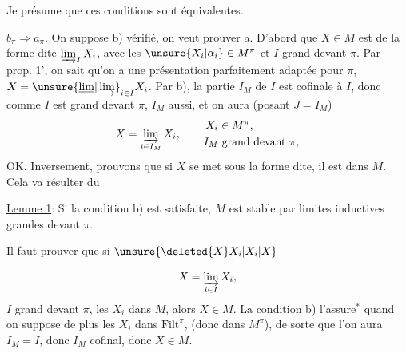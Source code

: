 Je présume que ces conditions sont équivalentes.

$b_\pi\Rightarrow a_\pi$. On suppose b) vérifié, on veut prouver a. D'abord que  $X\in M$ est de la forme dite $\varinjlim_I X_i$, avec les $\unsure{X_i|\alpha_i}\in M^{\pi}$ et $I$ grand devant $\pi$. Par prop. 1', on sait qu'on a une présentation parfaitement adaptée pour $\pi$, $X=\unsure{\underline{\lim}|\varinjlim}_{i\in I}X_i$. Par b),  la partie $I_M$ de $I$ est cofinale à $I$, donc comme $I$ est grand devant $\pi$, $I_M$ aussi, et on aura (posant $J=I_M$)
\[
X=\varinjlim_{i\in I_M}X_i,\qquad\begin{aligned}
X_i&\in M^{\pi},\\
I_M&\text{ grand devant }\pi,
\end{aligned}
\]
OK. Inversement, prouvons que si $X$ se met sous la forme dite,  il est dans $M$. Cela va résulter du

\uline{Lemme 1}: Si  la condition  b)  est satisfaite, $M$ est stable par limites inductives grandes devant  $\pi$.


Il faut prouver que si $\unsure{\deleted{X}X_i|X_i|X}$

\[
X=\varinjlim_{i\in I}X_i,
\]
$I$ grand devant $\pi$, les $X_i$ dans $M$, alors $X\in M$. La condition b)  l'assure$^\ast$ quand on suppose de plus les $X_i$ dans $\mathrm{Filt}^{\pi}$, (donc dans $M^{\pi}$), de sorte que l'on aura $I_M=I$, donc $I_M$ cofinal, donc $X\in M$.

